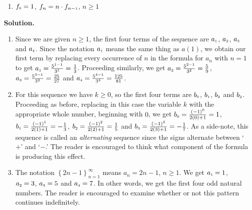 \begin{ex}
\begin{multicols}{2}
\begin{enumerate}
\item  \label{factorialintroex} $f_{\text{\tiny$0$}} = 1$, $f_{n} =n \cdot f_{n-\text{\tiny$1$}}$, $n \geq 1$

\setcounter{HW}{\value{enumi}}
\end{enumerate}
\end{multicols}



{\bf Solution.}

\begin{enumerate}

\item Since we are given $n \geq 1$, the first four terms of the sequence are  $a_{\text{\tiny$1$}}$, $a_{\text{\tiny$2$}}$, $a_{\text{\tiny$3$}}$ and $a_{\text{\tiny$4$}}$.  Since the notation $a_{\text{\tiny$1$}}$ means the same thing as $a(1)$, we obtain our first term by replacing every occurrence of $n$ in the formula for $a_{n}$ with $n=1$ to get  $a_{\text{\tiny$1$}} = \frac{5^{1-1}}{3^{1}} = \frac{1}{3}$.  Proceeding similarly, we get $a_{\text{\tiny$2$}} = \frac{5^{2-1}}{3^{2}} =\frac{5}{9}$, $a_{\text{\tiny$3$}} = \frac{5^{3-1}}{3^{3}} =\frac{25}{27}$ and $a_{\text{\tiny$4$}} = \frac{5^{4-1}}{3^{4}} =\frac{125}{81}$.  

\item For this sequence we have $k \geq 0$, so the first four terms are $b_{\text{\tiny$0$}}$, $b_{\text{\tiny$1$}}$, $b_{\text{\tiny$2$}}$ and $b_{\text{\tiny$3$}}$.  Proceeding as before, replacing in this case the variable $k$ with the appropriate whole number, beginning with $0$, we get $b_{\text{\tiny$0$}} = \frac{(-1)^{0}}{2(0)+1} = 1$, $b_{\text{\tiny$1$}} = \frac{(-1)^{1}}{2(1)+1} = - \frac{1}{3}$, $b_{\text{\tiny$2$}} = \frac{(-1)^{2}}{2(2)+1} = \frac{1}{5}$ and $b_{\text{\tiny$3$}} =  \frac{(-1)^{3}}{2(3)+1} = -\frac{1}{7}$.  As a side-note, this sequence is called an  \textit{alternating} sequence since the signs alternate between `$+$' and `$-$.' The reader is encouraged to think what component of the formula is producing this effect.

\item  The notation $\left\{ 2n - 1 \right\}_{n=1}^{\infty}$ means  $a_{n} = 2n -1$, $n \geq 1$.  We get $a_{\text{\tiny$1$}} = 1$, $a_{\text{\tiny$2$}} = 3$, $a_{\text{\tiny$3$}} = 5$ and $a_{\text{\tiny$4$}} = 7$.  In other words, we get the first four odd natural numbers.  The reader is encouraged to examine whether or not this pattern continues indefinitely.


\end{enumerate}
\end{ex}
